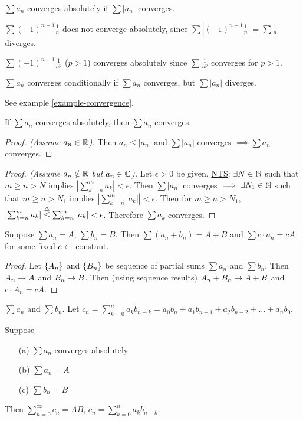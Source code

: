 \documentclass[]{article}
\begin{document}
\begin{definition}
	$\sum a_n$ converges absolutely if $\sum |a_n|$ converges.
\end{definition}
\begin{example}
	$\sum (-1)^{n+1}\frac 1n$ does not converge absolutely, since $\sum |(-1)^{n+1}\frac{1}{n}| = \sum \frac 1n$ diverges.
	\label{example-convergence}
\end{example}
\begin{example}
	$\sum (-1)^{n+1}\frac{1}{n^p}$ ($p>1$) converges absolutely since $\sum \frac{1}{n^p}$ converges for $p>1$.
\end{example}
\begin{definition}
	$\sum a_n$ converges conditionally if $\sum a_n$ converges, but $\sum |a_n|$ diverges.
\end{definition}
See example \ref{example-convergence}.
\begin{theorem}
	If $\sum a_n$ converges absolutely, then $\sum a_n$ converges.
\end{theorem}
\begin{proof}
	[Proof. (Assume $a_n\in\mathbb{R}$)]
	Then $a_n\leq |a_n|$ and $\sum |a_n|$ converges $\implies \sum a_n$ converges.
\end{proof}
\begin{proof}
	[Proof. (Assume $a_n\notin\mathbb{R}$ but $a_n\in\mathbb{C}$)]
	Let $\epsilon>0$ be given.
	\ul{NTS}: $\exists N\in\mathbb{N}$ such that $m\geq n>N$ implies $\left|\sum_{k=n}^m a_k \right| <\epsilon$.
	Then $\sum |a_n|$ converges $\implies \exists N_1\in\mathbb{N}$ such that $m\geq n>N_1$ implies $\left| \sum_{k=n}^m |a_k| \right| <\epsilon$.
	Then for $m\geq n>N_1$, $\left|\sum_{k=n}^m a_k\right| \overset{\Delta}{\leq} \sum_{k=n}^m |a_k| < \epsilon$.
	Therefore $\sum a_k$ converges.
\end{proof}

\begin{theorem}
	Suppose $\sum a_n = A$, $\sum b_n = B$. Then $\sum(a_n+b_n) = A+B$ and $\sum c\cdot a_n = cA$ for some fixed $c \leftarrow$ \ul{constant}.
\end{theorem}
\begin{proof}
	Let $\left\{ A_n \right\}$ and $\left\{ B_n \right\}$ be sequence of partial sums $\sum a_n$ and $\sum b_n$.
	Then $A_n\rightarrow A$ and $B_n\rightarrow B$. Then (using sequence results) $A_n+B_n\rightarrow A+B$ and $c\cdot A_n = cA$.
\end{proof}
\begin{recall}
	 $\sum a_n$ and $\sum b_n$.
	Let $c_n = \sum_{k=0}^n a_k b_{n-k} = a_0 b_n + a_1 b_{n-1} + a_2 b_{n-2}+ \dots + a_n b_0$.
\end{recall}
\begin{theorem}
	Suppose
	\begin{enumerate}
		\item[(a)] $\sum a_n$ converges absolutely
		\item[(b)] $\sum a_n = A$
		\item[(c)] $\sum b_n = B$
	\end{enumerate}
	Then $\sum_{n=0}^\infty c_n = AB$, $c_n = \sum_{k=0}^n a_k b_{n-k}$.
\end{theorem}
\end{document}
